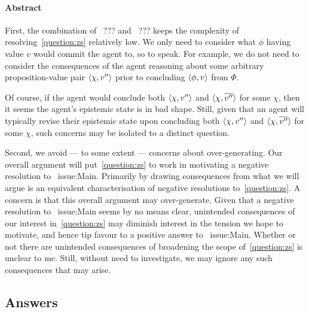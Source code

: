 \paragraph{Abstract}

\begin{note}
  First, the combination of~{\color{red} ???} and~{\color{red} ???} keeps the complexity of resolving~\autoref{question:zs} relatively low.
  We only need to consider what \(\phi\) having value \(v\) would commit the agent to, so to speak.
  For example, we do not need to consider the consequences of the agent reasoning about some arbitrary proposition-value pair \(\langle \chi, v'' \rangle\) prior to concluding \(\langle \phi, v \rangle\) from \(\Phi\).

  Of course, if the agent would conclude both \(\langle \chi, v'' \rangle\) and \(\langle \chi, \overline{v''} \rangle\) for some \(\chi\), then it seems the agent's epistemic state is in bad shape.
  Still, given that an agent will typically revise their epistemic state upon concluding both \(\langle \chi, v'' \rangle\) and \(\langle \chi, \overline{v''} \rangle\) for some \(\chi\), such concerns may be isolated to a distinct question.

  Second, we avoid --- to some extent --- concerns about over-generating.
  Our overall argument will put~\autoref{question:zs} to work in motivating a negative resolution to~{\color{red} issue:Main}.
  Primarily by drawing consequences from what we will argue is an equivalent characterisation of negative resolutions to~\autoref{question:zs}.
  A concern is that this overall argument may over-generate.
  Given that a negative resolution to~{\color{red} issue:Main} seems by no means clear, unintended consequences of our interest in~\autoref{question:zs} may diminish interest in the tension we hope to motivate, and hence tip favour to a positive answer to~{\color{red} issue:Main}.
  Whether or not there are unintended consequences of broadening the scope of~\autoref{question:zs} is unclear to me.
  Still, without need to investigate, we may ignore any such consequences that may arise.
\end{note}

\subsection{Answers}

